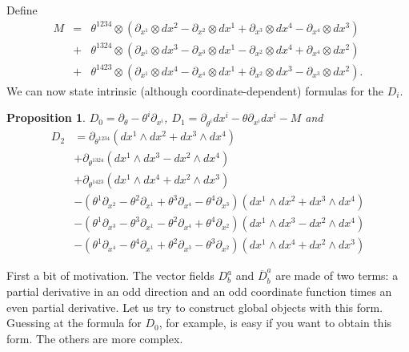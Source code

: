 \documentclass[twoside]{amsart}
\newtheorem{prop}{Proposition}
\newcommand{\enm}[1]{\ensuremath{#1}}
\renewcommand{\bar}[1]{\overline{#1}}
\newcommand{\wdu}[2]{\enm{\partial_{x^{#1}}\otimes dx^{#2}}}
\newcommand{\upperlowerabc}[3]{\enm{{#1}^{#2}_{#3}}}
\newcommand{\dul}[2]{\upperlowerabc{D}{#1}{#2}}
\begin{document}
Define
\begin{eqnarray*}
 M & = & \theta^{1234}\otimes(\wdu{1}{2} - \wdu{2}{1} +
 \wdu{3}{4} - \wdu{4}{3}) \\
 & + & \theta^{1324}\otimes(\wdu{1}{3} - \wdu{3}{1} -
 \wdu{2}{4} + \wdu{4}{2}) \\
 & + & \theta^{1423}\otimes(\wdu{1}{4} - \wdu{4}{1} +
 \wdu{2}{3} - \wdu{3}{2}).
\end{eqnarray*}
We can now state intrinsic (although coordinate-dependent) formulas
for the \( D_{i} \).

\begin{prop} \( D_{0} = \partial_{\theta} -
\theta^{i}\partial_{x^{i}}
\),
\( D_{1} = \partial_{\theta^{i}}dx^{i} - \theta\partial_{x^{i}}
dx^{i} - M \) and
\begin{align*}
    D_{2} & = \partial_{\theta^{1234}}
    (dx^{1}\wedge dx^{2}+dx^{3}\wedge dx^{4}) \\
    & + \partial_{\theta^{1324}}
    (dx^{1}\wedge dx^{3}-dx^{2}\wedge dx^{4}) \\
    & + \partial_{\theta^{1423}}
    (dx^{1}\wedge dx^{4}+dx^{2}\wedge dx^{3}) \\
    & - (\theta^{1}\partial_{x^{2}} - \theta^{2}\partial_{x^{1}}
    +\theta^{3}\partial_{x^{4}} - \theta^{4}\partial_{x^{3}})
    (dx^{1}\wedge dx^{2}+dx^{3}\wedge dx^{4}) \\
    & - (\theta^{1}\partial_{x^{3}} - \theta^{3}\partial_{x^{1}}
    -\theta^{2}\partial_{x^{4}} + \theta^{4}\partial_{x^{2}})
    (dx^{1}\wedge dx^{3}-dx^{2}\wedge dx^{4}) \\
    & - (\theta^{1}\partial_{x^{4}} - \theta^{4}\partial_{x^{1}}
    +\theta^{2}\partial_{x^{3}} - \theta^{3}\partial_{x^{2}})
    (dx^{1}\wedge dx^{4}+dx^{2}\wedge dx^{3})
\end{align*}
\end{prop}

\proof First a bit of motivation.  The vector fields
\dul{a}{b} and \upperlowerabc{\bar{D}}{a}{\dot{b}} are made of two
terms:  a partial derivative
in an odd direction and an odd coordinate function times an even
partial
derivative.  Let us try to construct global objects with this form.
Guessing at the formula for \( D_{0} \), for example, is easy if you
want to obtain
this form. The others are more complex.
\end{document}
